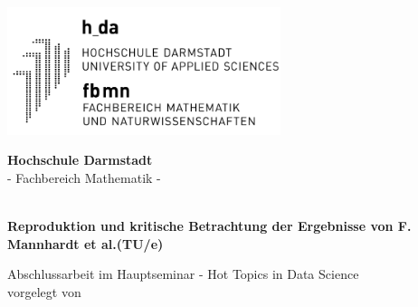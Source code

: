 \documentclass[
11pt, %
english,
singlespacing, %
]{MastersDoctoralThesis} %
\author{Lisa Stolz}
\begin{document}
\frontmatter %

\pagestyle{plain} %


\begin{titlepage}
\begin{center}

\vspace*{.06\textheight}
\includegraphics[width=8cm]{Logo/logo_h_da_fbmn300.png}
\vspace*{.02\textheight}

\Large{\textbf{\textsf{Hochschule Darmstadt}}} \\
\Large{\textsf{- Fachbereich Mathematik -}}
\vspace*{.06\textheight}
 
\huge{\textbf{\textsf{\ttitle}}}\\
\vspace{0.5em}
\Large{\textbf{\textsf{Reproduktion und kritische Betrachtung der Ergebnisse von F. Mannhardt et al.(TU/e)}}} \\
 
\vspace{3em}

\large{\textsf{Abschlussarbeit im Hauptseminar - Hot Topics in Data Science}} \\ \vspace{0.5em}
\large{\textsf{vorgelegt von}}
 
\vspace*{.04\textheight}
 
\textsf{\authorname}
 
\vspace{4.0em}

\begin{spacing}{1.5}
\textsf{}            \textsf{\makebox[7cm][r]{\supname}} \\
\textsf{\small{}}   \textsf{\small{\makebox[7cm][r]{\today}}}
\end{spacing}

\end{center}
\end{titlepage}
\newpage
\end{document}
